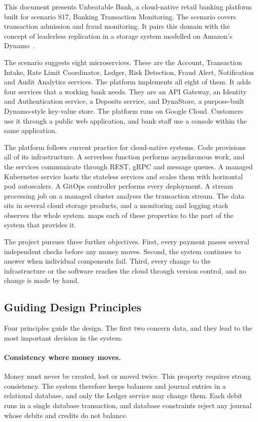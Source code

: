 \documentclass[11pt,a4paper]{article}
\newcommand{\project}{Unbeatable Bank}
\begin{document}
This document presents \project{}, a cloud-native retail banking platform built for scenario S17, Banking Transaction Monitoring. The scenario covers transaction admission and fraud monitoring. It pairs this domain with the concept of leaderless replication in a storage system modelled on Amazon's Dynamo~\cite{dynamo}.

The scenario suggests eight microservices. These are the Account, Transaction Intake, Rate Limit Coordinator, Ledger, Risk Detection, Fraud Alert, Notification and Audit Analytics services. The platform implements all eight of them. It adds four services that a working bank needs. They are an API Gateway, an Identity and Authentication service, a Deposits service, and DynaStore, a purpose-built Dynamo-style key-value store. The platform runs on Google Cloud. Customers use it through a public web application, and bank staff use a console within the same application.

The platform follows current practice for cloud-native systems. Code provisions all of its infrastructure. A serverless function performs asynchronous work, and the services communicate through REST, gRPC and message queues. A managed Kubernetes service hosts the stateless services and scales them with horizontal pod autoscalers. A GitOps controller performs every deployment. A stream processing job on a managed cluster analyses the transaction stream. The data sits in several cloud storage products, and a monitoring and logging stack observes the whole system.  maps each of these properties to the part of the system that provides it.

The project pursues three further objectives. First, every payment passes several independent checks before any money moves. Second, the system continues to answer when individual components fail. Third, every change to the infrastructure or the software reaches the cloud through version control, and no change is made by hand.

\subsection{Guiding Design Principles}
\label{sec:principles}

Four principles guide the design. The first two concern data, and they lead to the most important decision in the system.

\paragraph{Consistency where money moves.} Money must never be created, lost or moved twice. This property requires strong consistency. The system therefore keeps balances and journal entries in a relational database, and only the Ledger service may change them. Each debit runs in a single database transaction, and database constraints reject any journal whose debits and credits do not balance.
\end{document}

